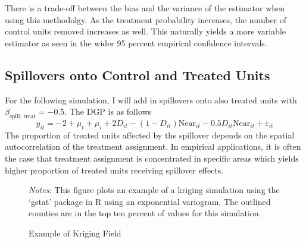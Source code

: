 \documentclass[11pt]{article}
\begin{document}
There is a trade-off between the bias and the variance of the estimator when using this methodolgy. As the treatment probability increases, the number of control units removed increases as well. This naturally yields a more variable estimator as seen in the wider 95 percent empirical confidence intervals. 


\subsection{Spillovers onto Control and Treated Units}

For the following simulation, I will add in spillovers onto also treated units with $\beta_{\text{spill, treat}} = -0.5$. The DGP is as follows 
\begin{equation}
    \label{dgp2} 
    y_{it} = -2 + \mu_t + \mu_i + 2 D_{it} - (1-D_{it}) \text{Near}_{it} - 0.5 D_{it} \text{Near}_{it} + \varepsilon_{it}   
\end{equation} 
The proportion of treated units affected by the spillover depends on the spatial autocorrelation of the treatment assignment. In empirical applications, it is often the case that treatment assignment is concentrated in specific areas which yields higher proportion of treated units receiving spillover effects.

\begin{figure}[tbh!]
    \caption{Example of Kriging Field}
    \label{fig:kriging}
    {\centering
    }
    {\footnotesize
        \textit{Notes:} This figure plots an example of a kriging simulation using the `gstat' package in R using an exponential variogram. The outlined counties are in the top ten percent of values for this simulation. 
    }
\end{figure}
\end{document}
